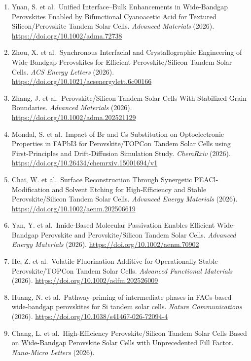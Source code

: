 \documentclass[
  11pt,
]{article}
\begin{document}
\begin{enumerate}
  Enables 2.00 V V oc in Efficient Perovskite/Silicon Tandem Solar
  Cells. \emph{Advanced Energy Materials} (2026).
  \url{https://doi.org/10.1002/aenm.71077}
\item
  Yuan, S. et al.~Unified Interface--Bulk Enhancements in Wide‐Bandgap
  Perovskites Enabled by Bifunctional Cyanoacetic Acid for Textured
  Silicon/Perovskite Tandem Solar Cells. \emph{Advanced Materials}
  (2026). \url{https://doi.org/10.1002/adma.72738}
\item
  Zhou, X. et al.~Synchronous Interfacial and Crystallographic
  Engineering of Wide-Bandgap Perovskites for Efficient
  Perovskite/Silicon Tandem Solar Cells. \emph{ACS Energy Letters}
  (2026). \url{https://doi.org/10.1021/acsenergylett.6c00166}
\item
  Zhang, J. et al.~Perovskite/Silicon Tandem Solar Cells With Stabilized
  Grain Boundaries. \emph{Advanced Materials} (2026).
  \url{https://doi.org/10.1002/adma.202521129}
\item
  Mondal, S. et al.~Impact of Br and Cs Substitution on Optoelectronic
  Properties in FAPbI3 for Perovskite/TOPCon Tandem Solar Cells using
  First-Principles and Drift-Diffusion Simulation Study. \emph{ChemRxiv}
  (2026). \url{https://doi.org/10.26434/chemrxiv.15001694/v1}
\item
  Chai, W. et al.~Surface Reconstruction Through Synergetic
  PEACl‐Modification and Solvent Etching for High‐Efficiency and Stable
  Perovskite/Silicon Tandem Solar Cells. \emph{Advanced Energy
  Materials} (2026). \url{https://doi.org/10.1002/aenm.202506619}
\item
  Yan, Y. et al.~Imide‐Based Molecular Passivation Enables Efficient
  Wide‐Bandgap Perovskite and Perovskite/Silicon Tandem Solar Cells.
  \emph{Advanced Energy Materials} (2026).
  \url{https://doi.org/10.1002/aenm.70902}
\item
  He, Z. et al.~Volatile Fluorination Additive for Operationally Stable
  Perovskite/TOPCon Tandem Solar Cells. \emph{Advanced Functional
  Materials} (2026). \url{https://doi.org/10.1002/adfm.202526009}
\item
  Huang, N. et al.~Pathway-priming of intermediate phases in FACs-based
  wide-bandgap perovskites for Si tandem solar cells. \emph{Nature
  Communications} (2026).
  \url{https://doi.org/10.1038/s41467-026-72094-4}
\item
  Chang, L. et al.~High-Efficiency Perovskite/Silicon Tandem Solar Cells
  Based on Wide-Bandgap Perovskite Solar Cells with Unprecedented Fill
  Factor. \emph{Nano-Micro Letters} (2026).

\end{enumerate}
\end{document}
